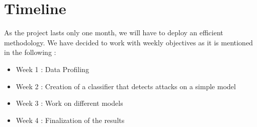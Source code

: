 \documentclass{article}
\begin{document}
\section{Timeline}

As the project lasts only one month, we will have to deploy an efficient methodology. We have decided to work with weekly objectives as it is mentioned in the following :
\begin{itemize}
    \item Week 1 : Data Profiling 
    \item Week 2 : Creation of a classifier that detects attacks on a simple model
    \item Week 3 : Work on different models
    \item Week 4 : Finalization of the results
\end{itemize}
\end{document}
